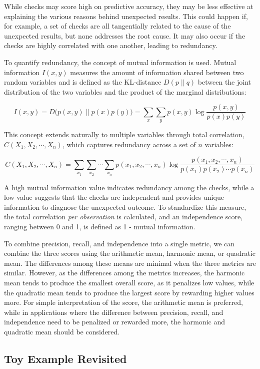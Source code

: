 \documentclass[
  12pt,
]{interact}
\begin{document}
While checks may score high on predictive accuracy, they may be less
effective at explaining the various reasons behind unexpected results.
This could happen if, for example, a set of checks are all tangentially
related to the cause of the unexpected results, but none addresses the
root cause. It may also occur if the checks are highly correlated with
one another, leading to redundancy.

To quantify redundancy, the concept of mutual information is used.
Mutual information \(I(x, y)\) measures the amount of information shared
between two random variables and is defined as the KL-distance
\(D(p \parallel q)\) between the joint distribution of the two variables
and the product of the marginal distributions:

\[I(x,y) = D\big(p(x,y) \parallel p(x)p(y)\big) = \sum_x \sum_y p(x,y) \log \frac{p(x,y)}{p(x)p(y)}\]

This concept extends naturally to multiple variables through total
correlation, \(C(X_1, X_2, \cdots, X_n)\), which captures redundancy
across a set of \(n\) variables:

\[C(X_1, X_2, \cdots, X_n) = \sum_{x_1} \sum_{x_2} \cdots \sum_{x_n} p(x_1, x_2, \cdots, x_n) \log \frac{p(x_1, x_2, \cdots, x_n)}{p(x_1)p(x_2) \cdots p(x_n)}\]

A high mutual information value indicates redundancy among the checks,
while a low value suggests that the checks are independent and provides
unique information to diagnose the unexpected outcome. To standardize
this measure, the total correlation \emph{per observation} is
calculated, and an independence score, ranging between 0 and 1, is
defined as 1 - mutual information.

To combine precision, recall, and independence into a single metric, we
can combine the three scores using the arithmetic mean, harmonic mean,
or quadratic mean. The differences among these means are minimal when
the three metrics are similar. However, as the differences among the
metrics increases, the harmonic mean tends to produce the smallest
overall score, as it penalizes low values, while the quadratic mean
tends to produce the largest score by rewarding higher values more. For
simple interpretation of the score, the arithmetic mean is preferred,
while in applications where the difference between precision, recall,
and independence need to be penalized or rewarded more, the harmonic and
quadratic mean should be considered.

\subsection{Toy Example Revisited}\label{toy-example-revisited}
\end{document}
